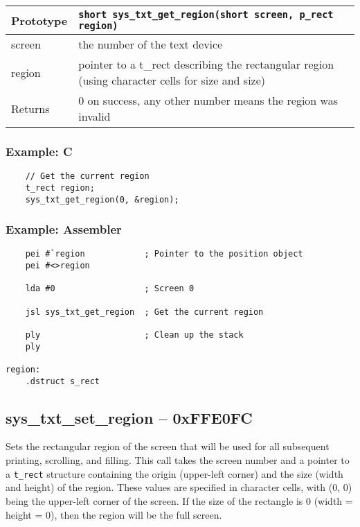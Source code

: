 \bigskip

\begin{tabular}{|l||l|} \hline
Prototype & \lstinline!short sys_txt_get_region(short screen, p_rect region)! \\ \hline
screen & the number of the text device \\ \hline
region & pointer to a t\_rect describing the rectangular region (using character cells for size and size) \\ \hline
Returns & 0 on success, any other number means the region was invalid \\ \hline
\end{tabular}

\subsubsection*{Example: C}
\begin{lstlisting}
    // Get the current region
    t_rect region;
    sys_txt_get_region(0, &region);
\end{lstlisting}

\subsubsection*{Example: Assembler}
\begin{verbatim}
    pei #`region            ; Pointer to the position object
    pei #<>region

    lda #0                  ; Screen 0

    jsl sys_txt_get_region  ; Get the current region

    ply                     ; Clean up the stack
    ply

region:
    .dstruct s_rect
\end{verbatim}


\subsection*{sys\_txt\_set\_region -- 0xFFE0FC}
Sets the rectangular region of the screen that will be used for all subsequent printing, scrolling, and filling.
This call takes the screen number and a pointer to a \verb+t_rect+ structure containing the origin (upper-left corner) and the size (width and height)
of the region. These values are specified in character cells, with (0, 0) being the upper-left corner of the screen.
If the size of the rectangle is 0 (width = height = 0), then the region will be the full screen.


